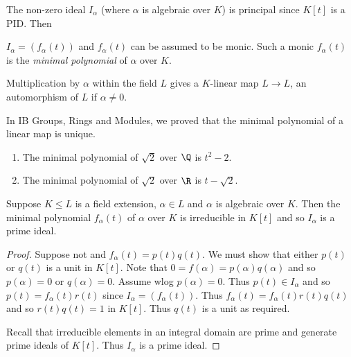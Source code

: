 \documentclass[a4paper]{article}
\begin{document}
The non-zero ideal \(I_\alpha\) (where \(\alpha\) is algebraic over \(K\)) is principal since \(K[t]\) is a PID. Then

\begin{definition}
  \(I_\alpha = (f_\alpha(t))\) and \(f_\alpha(t)\) can be assumed to be monic. Such a monic \(f_\alpha(t)\) is the \emph{minimal polynomial} of \(\alpha\) over \(K\).
\end{definition}

\begin{remark}
  Multiplication by \(\alpha\) within the field \(L\) gives a \(K\)-linear map \(L \to L\), an automorphism of \(L\) if \(\alpha \neq 0\).

  In IB Groups, Rings and Modules, we proved that the minimal polynomial of a linear map is unique.
\end{remark}

\begin{eg}\leavevmode
  \begin{enumerate}
  \item The minimal polynomial of \(\sqrt 2\) over \(\Q\) is \(t^2 - 2\).
  \item The minimal polynomial of \(\sqrt 2\) over \(\R\) is \(t - \sqrt 2\).
  \end{enumerate}
\end{eg}

\begin{lemma}
  Suppose \(K \leq L\) is a field extension, \(\alpha \in L\) and \(\alpha\) is algebraic over \(K\). Then the minimal polynomial \(f_\alpha(t)\) of \(\alpha\) over \(K\) is irreducible in \(K[t]\) and so \(I_\alpha\) is a prime ideal.
\end{lemma}

\begin{proof}
  Suppose not and \(f_\alpha(t) = p(t)q(t)\). We must show that either \(p(t)\) or \(q(t)\) is a unit in \(K[t]\). Note that \(0 = f(\alpha) = p(\alpha)q(\alpha)\) and so \(p(\alpha) = 0\) or \(q(\alpha) = 0\). Assume wlog \(p(\alpha) = 0\). Thus \(p(t) \in I_\alpha\) and so \(p(t) = f_\alpha(t)r(t)\) since \(I_\alpha = (f_\alpha(t))\). Thus \(f_\alpha(t) = f_\alpha(t)r(t)q(t)\) and so \(r(t)q(t) = 1\) in \(K[t]\). Thus \(q(t)\) is a unit as required.

  Recall that irreducible elements in an integral domain are prime and generate prime ideals of \(K[t]\). Thus \(I_\alpha\) is a prime ideal.
\end{proof}
\end{document}
